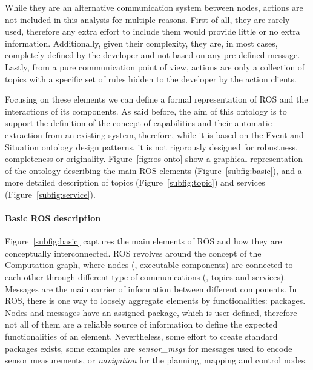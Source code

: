 While they are an alternative communication system between nodes, actions are not included in this analysis for multiple reasons. First of all, they are rarely used, therefore any extra effort to include them would provide little or no extra information. Additionally, given their complexity, they are, in most cases, completely defined by the developer and not based on any pre-defined message. Lastly, from a pure communication point of view, actions are only a collection of topics with a specific set of rules hidden to the developer by the action clients. 

Focusing on these elements we can define a formal representation of ROS and the interactions of its components. As said before, the aim of this ontology is to support the definition of the concept of capabilities and their automatic extraction from an existing system, therefore, while it is based on the Event and Situation ontology design patterns, it is not rigorously designed for robustness, completeness or originality. Figure~\ref{fig:ros-onto} show a graphical representation of the ontology describing the main ROS elements (Figure~\ref{subfig:basic}), and a more detailed description of topics (Figure~\ref{subfig:topic}) and services (Figure~\ref{subfig:service}).

\paragraph{Basic ROS description} Figure~\ref{subfig:basic} captures the main elements of ROS and how they are conceptually interconnected. ROS revolves around the concept of the Computation graph, where nodes (\ie, executable components) are connected to each other through different type of communications (\ie, topics and services). Messages are the main carrier of information between different components. In ROS, there is one way to loosely aggregate elements by functionalities: packages. Nodes and messages have an assigned package, which is user defined, therefore not all of them are a reliable source of information to define the expected functionalities of an element. Nevertheless, some effort to create standard packages exists, some examples are \textit{sensor\_msgs} for messages used to encode sensor measurements, or \textit{navigation} for the planning, mapping and control nodes.

